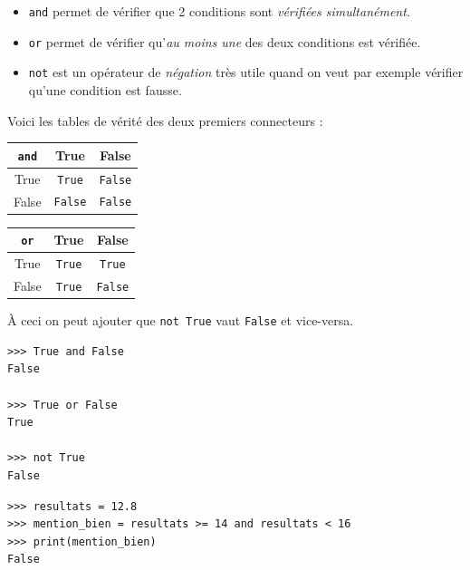 \begin{itemize}
	\item   \texttt{and} permet de vérifier que 2 conditions sont \textit{vérifiées simultanément}.
	\item   \texttt{or} permet de vérifier qu'\textit{au moins une} des deux conditions est vérifiée.
	\item   \texttt{not} est un opérateur de \textit{négation} très utile quand on veut par exemple vérifier qu'une condition est fausse.
\end{itemize}
Voici les tables de vérité des deux premiers connecteurs :
\begin{center}
	\tabstyle[UGLiBlue]
	\begin{tabular}{|c|c|c|}
		\hline
		\cellcolor{white} \texttt{and} & \ccell True                & \ccell False               \\
		\hline
		\ccell True                                & \texttt{True}  & \texttt{False} \\
		\hline
		\ccell False                               & \texttt{False} & \texttt{False} \\
		\hline
	\end{tabular}\hspace{4em}
	\begin{tabular}{|c|c|c|}
		\hline
		\cellcolor{white} \texttt{or} & \ccell True               & \ccell False               \\
		\hline
		\ccell True                               & \texttt{True} & \texttt{True}  \\
		\hline
		\ccell False                              & \texttt{True} & \texttt{False} \\
		\hline
	\end{tabular}
\end{center}
À ceci on peut ajouter que \texttt{not True} vaut \texttt{False} et vice-versa.

\begin{pyc}
	\begin{verbatim}
>>> True and False
False

>>> True or False
True

>>> not True
False
\end{verbatim}
\end{pyc}

\begin{pyc}
	\begin{verbatim}
>>> resultats = 12.8
>>> mention_bien = resultats >= 14 and resultats < 16
>>> print(mention_bien)
False
    \end{verbatim}
\end{pyc}

